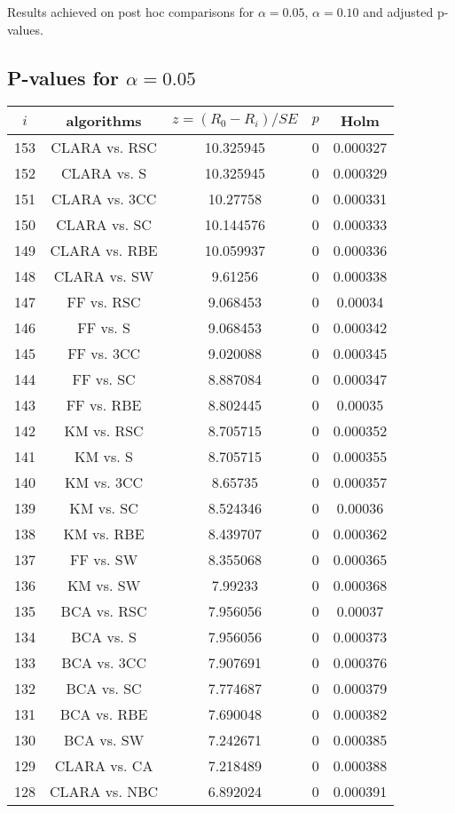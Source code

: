 \documentclass[a4paper,10pt]{article}
\begin{document}
\begin{landscape}
Results achieved on post hoc comparisons for $\alpha = 0.05$, $\alpha = 0.10$ and adjusted p-values.

\subsection{P-values for $\alpha=0.05$}

\begin{table}[!htp]
\centering\scriptsize
\begin{tabular}{ccccc}
$i$&algorithms&$z=(R_0 - R_i)/SE$&$p$&Holm\\
\hline153&CLARA vs. RSC&10.325945&0&0.000327\\
152&CLARA vs. S&10.325945&0&0.000329\\
151&CLARA vs. 3CC&10.27758&0&0.000331\\
150&CLARA vs. SC&10.144576&0&0.000333\\
149&CLARA vs. RBE&10.059937&0&0.000336\\
148&CLARA vs. SW&9.61256&0&0.000338\\
147&FF vs. RSC&9.068453&0&0.00034\\
146&FF vs. S&9.068453&0&0.000342\\
145&FF vs. 3CC&9.020088&0&0.000345\\
144&FF vs. SC&8.887084&0&0.000347\\
143&FF vs. RBE&8.802445&0&0.00035\\
142&KM vs. RSC&8.705715&0&0.000352\\
141&KM vs. S&8.705715&0&0.000355\\
140&KM vs. 3CC&8.65735&0&0.000357\\
139&KM vs. SC&8.524346&0&0.00036\\
138&KM vs. RBE&8.439707&0&0.000362\\
137&FF vs. SW&8.355068&0&0.000365\\
136&KM vs. SW&7.99233&0&0.000368\\
135&BCA vs. RSC&7.956056&0&0.00037\\
134&BCA vs. S&7.956056&0&0.000373\\
133&BCA vs. 3CC&7.907691&0&0.000376\\
132&BCA vs. SC&7.774687&0&0.000379\\
131&BCA vs. RBE&7.690048&0&0.000382\\
130&BCA vs. SW&7.242671&0&0.000385\\
129&CLARA vs. CA&7.218489&0&0.000388\\
128&CLARA vs. NBC&6.892024&0&0.000391\\

\end{tabular}
\end{table}
\end{landscape}
\end{document}

